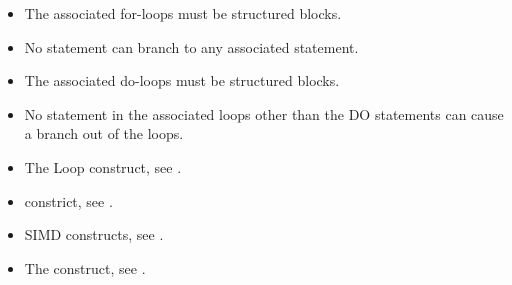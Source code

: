 \begin{ccppspecific}
\begin{itemize}
    
  \item The associated for-loops must be structured blocks.

  \item No statement can branch to any associated  statement.

\end{itemize}

\end{ccppspecific}

\begin{fortranspecific}
\begin{itemize}
    
  \item The associated do-loops must be structured blocks.
    
  \item No statement in the associated loops other than the DO statements can cause
    a branch out of the loops.


\end{itemize}
\end{fortranspecific}

\crossreferences
\begin{itemize}
  \item The Loop construct, see .

  \item {} constrict, see .

  \item SIMD constructs, see .

  \item The  construct, see .

\end{itemize}
